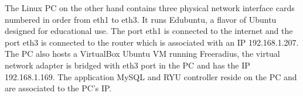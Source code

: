 The Linux PC on the other hand contains three physical network interface cards numbered in order from eth1 to eth3. It runs Edubuntu, a flavor of Ubuntu designed for educational use. The port eth1 is connected to the internet and the port eth3 is connected to the router which is associated with an IP 192.168.1.207. The PC also hosts a VirtualBox Ubuntu VM running Freeradius, the virtual network adapter is bridged with eth3 port in the PC and has the IP 192.168.1.169. The application MySQL and RYU controller reside on the PC and are associated to the PC’s IP.
%	

